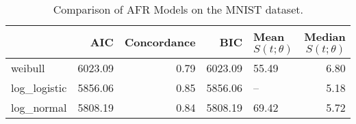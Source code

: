 \begin{table}
\caption{Comparison of AFR Models on the MNIST dataset.}
\label{tab:mnist}
\begin{tabular}{lrrrlr}
\toprule
 & AIC & Concordance & BIC & Mean $S(t;\theta)$ & Median $S(t;\theta)$ \\
\midrule
weibull & 6023.09 & 0.79 & 6023.09 & 55.49 & 6.80 \\
log_logistic & 5856.06 & 0.85 & 5856.06 & -- & 5.18 \\
log_normal & 5808.19 & 0.84 & 5808.19 & 69.42 & 5.72 \\
\bottomrule
\end{tabular}
\end{table}
